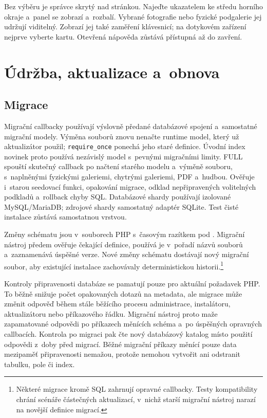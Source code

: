 \documentclass[11pt,a4paper]{article}
\newcommand{\filepath}[1]{\path{#1}}
\newcommand{\codeword}[1]{\nolinkurl{#1}}
\begin{document}
Bez výběru je správce skrytý nad stránkou. Najeďte ukazatelem ke středu
horního okraje a~panel se zobrazí a~rozbalí. Vybrané fotografie nebo fyzické
podgalerie jej udržují viditelný. Zobrazí jej také zaměření klávesnicí;
na dotykovém zařízení nejprve vyberte kartu. Otevřená nápověda zůstává
přístupná až do zavření.

\section{Údržba, aktualizace a~obnova}
\label{sec:maintenance}

\subsection{Migrace}

Migrační callbacky používají výslovně předané databázové spojení a~samostatné
migrační modely. Výměna souborů znovu nenačte runtime model, který už
aktualizátor
použil; \codeword{require\_once} ponechá jeho staré definice. Úvodní index
novinek
proto používá nezávislý model s~pevnými migračními limity. FULL spouští skutečný
callback po načtení starého modelu a~výměně souboru, s~naplněnými fyzickými
galeriemi, chytrými galeriemi, PDF a~hudbou. Ověřuje i~starou seedovací funkci,
opakování migrace, odklad nepřipravených volitelných podkladů a~rollback chyby
SQL.
Databázové shardy používají izolované MySQL/MariaDB; zdrojové shardy samostatný
adaptér SQLite. Test čisté instalace zůstává samostatnou vrstvou.

Změny schématu jsou v~souborech PHP s~časovým razítkem pod
\filepath{database/migrations/}. Migrační nástroj předem ověřuje čekající
definice, používá je v~pořadí názvů souborů a~zaznamenává úspěšné verze. Nové
změny schématu dostávají nový migrační soubor, aby existující instalace
zachovávaly deterministickou historii.\footnote{Některé migrace kromě SQL
zahrnují opravné callbacky. Testy kompatibility chrání scénáře částečných
aktualizací, v~nichž starší migrační nástroj narazí na novější definice
migrací.}

Kontroly připravenosti databáze se pamatují pouze pro aktuální požadavek PHP. To
běžně snižuje počet opakovaných dotazů na metadata, ale migrace může změnit
odpověď během stále běžícího procesu administrace, instalátoru, aktualizátoru
nebo příkazového řádku. Migrační nástroj proto maže zapamatované odpovědi po
příkazech měnících schéma a~po úspěšných opravných callbacích. Kontrola po
migraci pak čte nový databázový katalog místo použití odpovědi z~doby před
migrací. Běžné migrační příkazy měnící pouze data mezipaměť připravenosti
nemažou, protože nemohou vytvořit ani odstranit tabulku, pole či index.
\end{document}
